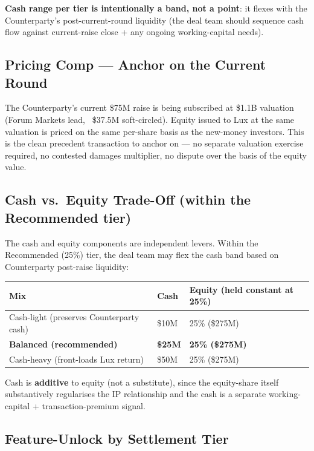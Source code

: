 \documentclass[11pt,letterpaper]{article}
\begin{document}
\textbf{Cash range per tier is intentionally a band, not a point}: it
flexes with the Counterparty's post-current-round liquidity (the deal
team should sequence cash flow against current-raise close + any
ongoing working-capital needs).

\subsection*{Pricing Comp --- Anchor on the Current Round}

The Counterparty's current \$75M raise is being subscribed at \$1.1B
valuation (Forum Markets lead, ~\$37.5M soft-circled). Equity issued
to Lux at the same valuation is priced on the same per-share basis
as the new-money investors. This is the clean precedent transaction
to anchor on --- no separate valuation exercise required, no
contested damages multiplier, no dispute over the basis of the
equity value.

\subsection*{Cash vs.\ Equity Trade-Off (within the Recommended tier)}

The cash and equity components are independent levers. Within the
Recommended (25\%) tier, the deal team may flex the cash band based
on Counterparty post-raise liquidity:

\begin{center}
\begin{tabular}{lll}
\toprule
\textbf{Mix} & \textbf{Cash} & \textbf{Equity (held constant at 25\%)} \\
\midrule
Cash-light (preserves Counterparty cash) & \$10M & 25\% (\$275M) \\
\textbf{Balanced (recommended)}          & \textbf{\$25M} & \textbf{25\% (\$275M)} \\
Cash-heavy (front-loads Lux return)      & \$50M & 25\% (\$275M) \\
\bottomrule
\end{tabular}
\end{center}

Cash is \textbf{additive} to equity (not a substitute), since the
equity-share itself substantively regularises the IP relationship and
the cash is a separate working-capital + transaction-premium signal.

\subsection*{Feature-Unlock by Settlement Tier}
\end{document}
